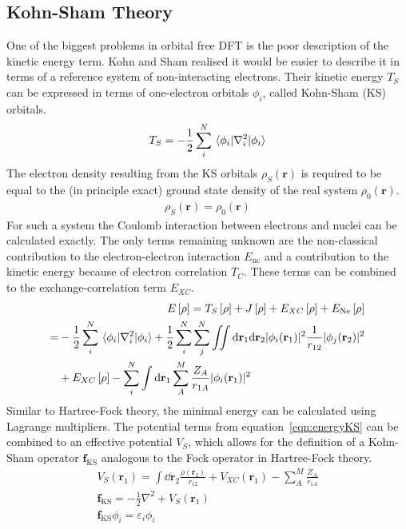 \subsection{Kohn-Sham Theory}
\label{sec:kohnshamtheory}

One of the biggest problems in orbital free \ac{DFT} is the poor description of
the kinetic energy term. Kohn and Sham realised it would be easier to describe
it in terms of a reference system of non-interacting electrons. Their kinetic
energy $T_S$ can be expressed in terms of
one-electron orbitals $\phi_i$, called Kohn-Sham (KS) orbitals.
%
\begin{align}
    T_S=-\frac{1}{2}\sum_i^N\mel{\phi_i}{\nabla_i^2}{\phi_i}
\end{align}
%
The electron density resulting from the KS orbitals $\rho_S(\mathbf{r})$ is
required to be equal to the (in principle exact) ground state density of the
real system $\rho_0(\mathbf{r})$.
%
\begin{align}
    \rho_S(\mathbf{r}) = \rho_0(\mathbf{r})
\end{align}
%
For such a system the Coulomb interaction between electrons and nuclei can be
calculated exactly. The only terms remaining unknown are the non-classical
contribution to the electron-electron interaction $E_\text{nc}$ and a
contribution to the kinetic energy because of electron correlation $T_C$. These
terms can be combined to the exchange-correlation term $E_{XC}$.
%
\begin{align}
    E\left[\rho\right]=T_S\left[\rho\right] + J\left[\rho\right] + E_{XC}\left[\rho\right] + E_\text{Ne}\left[\rho\right] \\
    \begin{aligned}
        =&-\frac{1}{2}\sum_i^N\mel{\phi_i}{\nabla_i^2}{\phi_i} + \frac{1}{2}\sum_i^N\sum_j^N\iint \dd\mathbf{r}_1\dd\mathbf{r}_2|\phi_i(\mathbf{r}_1)|^2\frac{1}{r_{12}}|\phi_j(\mathbf{r}_2)|^2 \\
        &+ E_{XC}\left[\rho\right] - \sum_i^N\int\dd\mathbf{r}_1\sum_A^M \frac{Z_A}{r_{1A}} |\phi_i(\mathbf{r}_1)|^2
    \end{aligned}\label{eqn:energyKS}
\end{align}
%
Similar to Hartree-Fock theory, the minimal energy can be calculated using
Lagrange multipliers. The potential terms from equation~\eqref{eqn:energyKS}
can be combined to an effective potential $V_S$, which allows for the
definition of a Kohn-Sham operator $\mathbf{f}_\text{KS}$ analogous to the Fock
operator in Hartree-Fock theory.
%
\begin{align}
    V_S(\mathbf{r}_1) = \int\dd\mathbf{r}_2\frac{\rho(\mathbf{r}_2)}{r_{12}} + V_{XC}(\mathbf{r}_1) - \sum_A^M\frac{Z_A}{r_{1A}}\\
    \mathbf{f}_\text{KS} = -\frac{1}{2}\nabla^2+V_S(\mathbf{r}_1)\\
    \mathbf{f}_\text{KS}\phi_i=\varepsilon_i\phi_i
\end{align}
